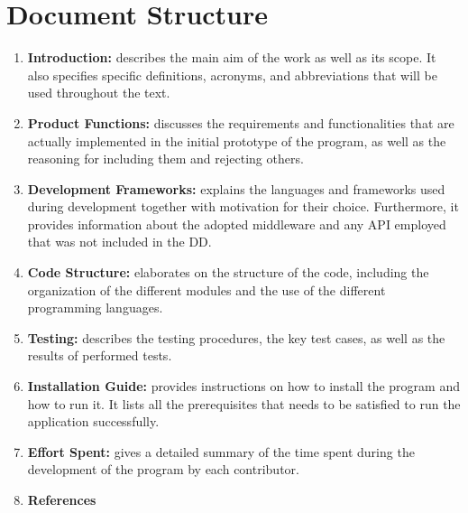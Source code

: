 \printbibliography[title={Reference Documents}, keyword=intro, heading=subbibnumbered]

\section{Document Structure}

\begin{enumerate}
    \item \textbf{Introduction:} describes the main aim of the work as well as its scope. It also specifies specific definitions, acronyms, and abbreviations that will be used throughout the text.
    \item \textbf{Product Functions:} discusses the requirements and functionalities that are actually implemented in the initial prototype of the program, as well as the reasoning for including them and rejecting others.
    \item \textbf{Development Frameworks:} explains the languages and frameworks used during development together with motivation for their choice. Furthermore, it provides information about the adopted middleware and any API employed that was not included in the DD.
    \item \textbf{Code Structure:} elaborates on the structure of the code, including the organization of the different modules and the use of the different programming languages.
    \item \textbf{Testing:} describes the testing procedures, the key test cases, as well as the results of performed tests.
    \item \textbf{Installation Guide:} provides instructions on how to install the program and how to run it. It lists all the prerequisites that needs to be satisfied to run the application successfully.
    \item \textbf{Effort Spent:} gives a detailed summary of the time spent during the development of the program by each contributor.
    \item \textbf{References}
\end{enumerate}
